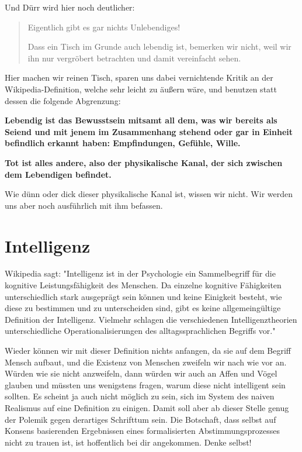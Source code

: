 \documentclass[12pt]{book}
\begin{document}
Und Dürr wird hier noch deutlicher:
\begin{quote}\begin{tcolorbox}
Eigentlich gibt es gar nichts Unlebendiges!

Dass ein Tisch im Grunde auch lebendig ist, bemerken wir nicht, weil wir ihn nur vergröbert betrachten und damit vereinfacht sehen.
\end{tcolorbox}\end{quote}

Hier machen wir reinen Tisch, sparen uns dabei vernichtende Kritik an der Wikipedia-Definition, welche sehr leicht zu äußern wäre, und benutzen statt dessen die folgende Abgrenzung:

\textbf{Lebendig ist das Bewusstsein mitsamt all dem, was wir bereits als Seiend und mit jenem im Zusammenhang stehend oder gar in Einheit befindlich erkannt haben: Empfindungen, Gefühle, Wille.} 

\textbf{Tot ist alles andere, also der physikalische Kanal, der sich zwischen dem Lebendigen befindet.}

Wie dünn oder dick dieser physikalische Kanal ist, wissen wir nicht. Wir werden uns aber noch ausführlich mit ihm befassen.

\section{Intelligenz}

Wikipedia sagt: "Intelligenz ist in der Psychologie ein Sammelbegriff für die kognitive Leistungsfähigkeit des Menschen. Da einzelne kognitive Fähigkeiten unterschiedlich stark ausgeprägt sein können und keine Einigkeit besteht, wie diese zu bestimmen und zu unterscheiden sind, gibt es keine allgemeingültige Definition der Intelligenz. Vielmehr schlagen die verschiedenen Intelligenztheorien unterschiedliche Operationalisierungen des alltagssprachlichen Begriffs vor."

Wieder können wir mit dieser Definition nichts anfangen, da sie auf dem Begriff Mensch aufbaut, und die Existenz von Menschen zweifeln wir nach wie vor an. Würden wie sie nicht anzweifeln, dann würden wir auch an Affen und Vögel glauben und müssten uns wenigstens fragen, warum diese nicht intelligent sein sollten. Es scheint ja auch nicht möglich zu sein, sich im System des naiven Realismus auf eine Definition zu einigen. Damit soll aber ab dieser Stelle genug der Polemik gegen derartiges Schrifttum sein. Die Botschaft, dass selbst auf Konsens basierenden Ergebnissen eines formalisierten Abstimmungsprozesses nicht zu trauen ist, ist hoffentlich bei dir angekommen. Denke selbst! 
\end{document}

